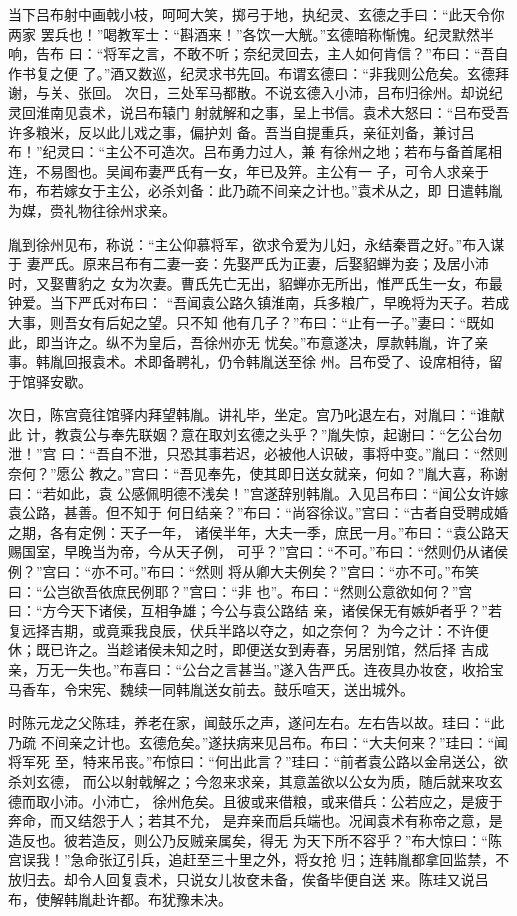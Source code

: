 当下吕布射中画戟小枝，呵呵大笑，掷弓于地，执纪灵、玄德之手曰：“此天令你两家
罢兵也！”喝教军士：“斟酒来！”各饮一大觥。”玄德暗称惭愧。纪灵默然半响，告布
曰：“将军之言，不敢不听；奈纪灵回去，主人如何肯信？”布曰：“吾自作书复之便
了。”酒又数巡，纪灵求书先回。布谓玄德曰：“非我则公危矣。玄德拜谢，与关、张回。
次日，三处军马都散。不说玄德入小沛，吕布归徐州。却说纪灵回淮南见袁术，说吕布辕门
射就解和之事，呈上书信。袁术大怒曰：“吕布受吾许多粮米，反以此儿戏之事，偏护刘
备。吾当自提重兵，亲征刘备，兼讨吕布！”纪灵曰：“主公不可造次。吕布勇力过人，兼
有徐州之地；若布与备首尾相连，不易图也。吴闻布妻严氏有一女，年已及笄。主公有一
子，可令人求亲于布，布若嫁女于主公，必杀刘备：此乃疏不间亲之计也。”袁术从之，即
日遣韩胤为媒，赍礼物往徐州求亲。

胤到徐州见布，称说：“主公仰慕将军，欲求令爱为儿妇，永结秦晋之好。”布入谋于
妻严氏。原来吕布有二妻一妾：先娶严氏为正妻，后娶貂蝉为妾；及居小沛时，又娶曹豹之
女为次妻。曹氏先亡无出，貂蝉亦无所出，惟严氏生一女，布最钟爱。当下严氏对布曰：
“吾闻袁公路久镇淮南，兵多粮广，早晚将为天子。若成大事，则吾女有后妃之望。只不知
他有几子？”布曰：“止有一子。”妻曰：“既如此，即当许之。纵不为皇后，吾徐州亦无
忧矣。”布意遂决，厚款韩胤，许了亲事。韩胤回报袁术。术即备聘礼，仍令韩胤送至徐
州。吕布受了、设席相待，留于馆驿安歇。

次日，陈宫竟往馆驿内拜望韩胤。讲礼毕，坐定。宫乃叱退左右，对胤曰：“谁献此
计，教袁公与奉先联姻？意在取刘玄德之头乎？”胤失惊，起谢曰：“乞公台勿泄！”宫
曰：“吾自不泄，只恐其事若迟，必被他人识破，事将中变。”胤曰：“然则奈何？”愿公
教之。”宫曰：“吾见奉先，使其即日送女就亲，何如？”胤大喜，称谢曰：“若如此，袁
公感佩明德不浅矣！”宫遂辞别韩胤。入见吕布曰：“闻公女许嫁袁公路，甚善。但不知于
何日结亲？”布曰：“尚容徐议。”宫曰：“古者自受聘成婚之期，各有定例：天子一年，
诸侯半年，大夫一季，庶民一月。”布曰：“袁公路天赐国室，早晚当为帝，今从天子例，
可乎？”宫曰：“不可。”布曰：“然则仍从诸侯例？”宫曰：“亦不可。”布曰：“然则
将从卿大夫例矣？”宫曰：“亦不可。”布笑曰：“公岂欲吾依庶民例耶？”宫曰：“非
也”。布曰：“然则公意欲如何？”宫曰：“方今天下诸侯，互相争雄；今公与袁公路结
亲，诸侯保无有嫉妒者乎？”若复远择吉期，或竟乘我良辰，伏兵半路以夺之，如之奈何？
为今之计：不许便休；既已许之。当趁诸侯未知之时，即便送女到寿春，另居别馆，然后择
吉成亲，万无一失也。”布喜曰：“公台之言甚当。”遂入告严氏。连夜具办妆奁，收拾宝
马香车，令宋宪、魏续一同韩胤送女前去。鼓乐喧天，送出城外。

时陈元龙之父陈珪，养老在家，闻鼓乐之声，遂问左右。左右告以故。珪曰：“此乃疏
不间亲之计也。玄德危矣。”遂扶病来见吕布。布曰：“大夫何来？”珪曰：“闻将军死
至，特来吊丧。”布惊曰：“何出此言？”珪曰：“前者袁公路以金帛送公，欲杀刘玄德，
而公以射戟解之；今忽来求亲，其意盖欲以公女为质，随后就来攻玄德而取小沛。小沛亡，
徐州危矣。且彼或来借粮，或来借兵：公若应之，是疲于奔命，而又结怨于人；若其不允，
是弃亲而启兵端也。况闻袁术有称帝之意，是造反也。彼若造反，则公乃反贼亲属矣，得无
为天下所不容乎？”布大惊曰：“陈宫误我！”急命张辽引兵，追赶至三十里之外，将女抢
归；连韩胤都拿回监禁，不放归去。却令人回复袁术，只说女儿妆奁未备，俟备毕便自送
来。陈珪又说吕布，使解韩胤赴许都。布犹豫未决。

